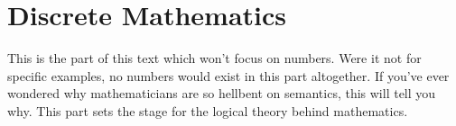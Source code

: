 
\part{Discrete Mathematics} %
\thispagestyle{empty}
This is the part of this text which won't focus on numbers.
Were it not for specific examples, no numbers would exist in this part altogether.
If you've ever wondered why mathematicians are so hellbent on semantics, this will tell you why.
This part sets the stage for the logical theory behind mathematics.
\setcounter{section}{0}





%
%
